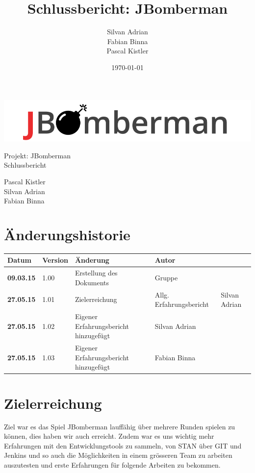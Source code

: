 \documentclass[11pt]{scrartcl}
\title{Schlussbericht: JBomberman}
\author{Silvan Adrian \\ Fabian Binna \\ Pascal Kistler}
\date{\today{}}
\begin{document}
\def\arraystretch{1.5}
\begin{titlepage}
\begin{center}
\vspace{10em}
\includegraphics[scale=2]{jbomberman}
\vspace{10em}
\end{center}
\begin{center}
\huge {Projekt: JBomberman} \\
\huge {Schlussbericht}
\end{center}
\begin{center}
\vspace{10em}
\LARGE {Pascal Kistler} \\
\LARGE {Silvan Adrian} \\
\LARGE {Fabian Binna}
\end{center}

\end{titlepage}

\newpage
\section{Änderungshistorie}
\label{sec:Änderungen}

\begin{tabularx}{\linewidth}{l l l l}
\textbf{Datum} & \textbf{Version} & \textbf{Änderung}  & \textbf{Autor} \\
\hline
\textbf{09.03.15} & 1.00 & Erstellung des Dokuments & Gruppe \\
\textbf{27.05.15} & 1.01 & Zielerreichung & Allg. Erfahrungsbericht & Silvan 
Adrian\\
\textbf{27.05.15} & 1.02 & Eigener Erfahrungsbericht hinzugefügt & Silvan 
Adrian\\
\textbf{27.05.15} & 1.03 & Eigener Erfahrungsbericht hinzugefügt & Fabian Binna
\end{tabularx}

\newpage
\tableofcontents
\newpage

\section{Zielerreichung}
Ziel war es das Spiel JBomberman lauffähig über mehrere Runden spielen zu 
können, dies haben wir auch erreicht.
Zudem war es uns wichtig mehr Erfahrungen mit den Entwicklungstools zu sammeln,
von STAN über GIT und Jenkins und so auch die Möglichkeiten 
in einem grösseren Team zu arbeiten auszutesten und erste Erfahrungen 
für folgende Arbeiten zu bekommen.
\end{document}

